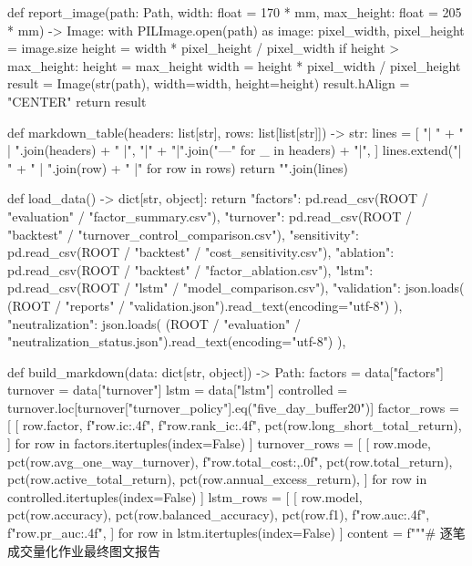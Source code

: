 \documentclass[UTF8,a4paper,fontset=fandol]{ctexart}
\begin{document}
\begin{ProjectCode}
{def report_image(path: Path, width: float = 170 * mm, max_height: float = 205 * mm) -> Image:
    with PILImage.open(path) as image:
        pixel_width, pixel_height = image.size
    height = width * pixel_height / pixel_width
    if height > max_height:
        height = max_height
        width = height * pixel_width / pixel_height
    result = Image(str(path), width=width, height=height)
    result.hAlign = "CENTER"
    return result


def markdown_table(headers: list[str], rows: list[list[str]]) -> str:
    lines = [
        "| " + " | ".join(headers) + " |",
        "|" + "|".join("---" for _ in headers) + "|",
    ]
    lines.extend("| " + " | ".join(row) + " |" for row in rows)
    return "\n".join(lines)


def load_data() -> dict[str, object]:
    return {
        "factors": pd.read_csv(ROOT / "evaluation" / "factor_summary.csv"),
        "turnover": pd.read_csv(ROOT / "backtest" / "turnover_control_comparison.csv"),
        "sensitivity": pd.read_csv(ROOT / "backtest" / "cost_sensitivity.csv"),
        "ablation": pd.read_csv(ROOT / "backtest" / "factor_ablation.csv"),
        "lstm": pd.read_csv(ROOT / "lstm" / "model_comparison.csv"),
        "validation": json.loads(
            (ROOT / "reports" / "validation.json").read_text(encoding="utf-8")
        ),
        "neutralization": json.loads(
            (ROOT / "evaluation" / "neutralization_status.json").read_text(encoding="utf-8")
        ),
    }


def build_markdown(data: dict[str, object]) -> Path:
    factors = data["factors"]
    turnover = data["turnover"]
    lstm = data["lstm"]
    controlled = turnover.loc[turnover["turnover_policy"].eq("five_day_buffer20")]
    factor_rows = [
        [
            row.factor,
            f"{row.ic:.4f}",
            f"{row.rank_ic:.4f}",
            pct(row.long_short_total_return),
        ]
        for row in factors.itertuples(index=False)
    ]
    turnover_rows = [
        [
            row.mode,
            pct(row.avg_one_way_turnover),
            f"{row.total_cost:,.0f}",
            pct(row.total_return),
            pct(row.active_total_return),
            pct(row.annual_excess_return),
        ]
        for row in controlled.itertuples(index=False)
    ]
    lstm_rows = [
        [
            row.model,
            pct(row.accuracy),
            pct(row.balanced_accuracy),
            pct(row.f1),
            f"{row.auc:.4f}",
            f"{row.pr_auc:.4f}",
        ]
        for row in lstm.itertuples(index=False)
    ]
    content = f"""# 逐笔成交量化作业最终图文报告

}
\end{ProjectCode}
\end{document}
